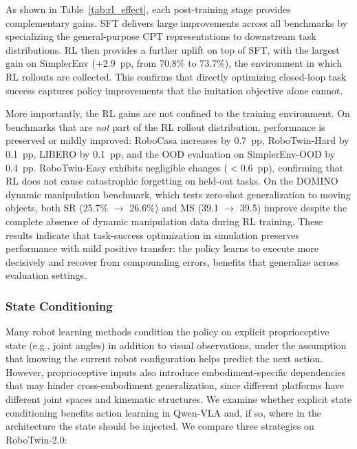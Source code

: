 \documentclass{llmxive}
\begin{document}
As shown in Table~\ref{tab:rl_effect}, each post-training stage provides complementary gains.
SFT delivers large improvements across all benchmarks by specializing the general-purpose CPT representations to downstream task distributions.
RL then provides a further uplift on top of SFT, with the largest gain on SimplerEnv (+2.9~pp, from 70.8\% to 73.7\%), the environment in which RL rollouts are collected.
This confirms that directly optimizing closed-loop task success captures policy improvements that the imitation objective alone cannot.

More importantly, the RL gains are not confined to the training environment.
On benchmarks that are \emph{not} part of the RL rollout distribution, performance is preserved or mildly improved: RoboCasa increases by 0.7~pp, RoboTwin-Hard by 0.1~pp, LIBERO by 0.1~pp, and the OOD evaluation on SimplerEnv-OOD by 0.4~pp.
RoboTwin-Easy exhibits negligible changes ($<$0.6~pp), confirming that RL does not cause catastrophic forgetting on held-out tasks.
On the DOMINO dynamic manipulation benchmark, which tests zero-shot generalization to moving objects, both SR (25.7\% $\to$ 26.6\%) and MS (39.1 $\to$ 39.5) improve despite the complete absence of dynamic manipulation data during RL training.
These results indicate that task-success optimization in simulation preserves performance with mild positive transfer: the policy learns to execute more decisively and recover from compounding errors, benefits that generalize across evaluation settings.


\subsubsection{State Conditioning}
\label{sec:ablation_state}

Many robot learning methods condition the policy on explicit proprioceptive state (e.g., joint angles) in addition to visual observations, under the assumption that knowing the current robot configuration helps predict the next action.
However, proprioceptive inputs also introduce embodiment-specific dependencies that may hinder cross-embodiment generalization, since different platforms have different joint spaces and kinematic structures.
We examine whether explicit state conditioning benefits action learning in Qwen-VLA and, if so, where in the architecture the state should be injected.
We compare three strategies on RoboTwin-2.0:
\end{document}

